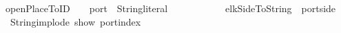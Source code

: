 \isamarkupfalse%
\ openPlaceToID\ {\isacharcolon}{\isacharcolon}\ {\isachardoublequoteopen}{\isacharparenleft}\ \ port\ {\isasymRightarrow}\ String{\isachardot}literal{\isachardoublequoteclose}\isanewline
\ \ \ {\isachardoublequoteopen}\ \ {\isacharequal}\isanewline
\ \ \ {\isacharplus}\isanewline
\ \ elkSideToString\ {\isacharparenleft}\ {\isacharparenleft}port{\isachardot}side\ \ {\isacharplus}\isanewline
\ \ String{\isachardot}implode\ {\isacharparenleft}show\ {\isacharparenleft}port{\isachardot}index\ 
